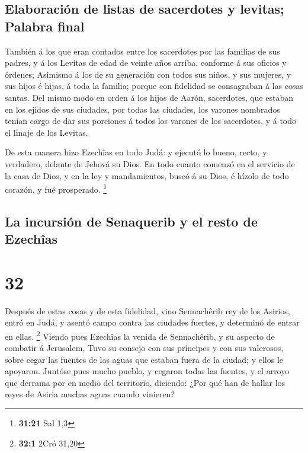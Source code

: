 \hypertarget{elaboraciuxf3n-de-listas-de-sacerdotes-y-levitas-palabra-final}{%
\subsection{Elaboración de listas de sacerdotes y levitas; Palabra
final}\label{elaboraciuxf3n-de-listas-de-sacerdotes-y-levitas-palabra-final}}

 También á los que eran contados entre los sacerdotes por
las familias de sus padres, y á los Levitas de edad de veinte años
arriba, conforme á sus oficios y órdenes;  Asimismo á los
de su generación con todos sus niños, y sus mujeres, y sus hijos é
hijas, á toda la familia; porque con fidelidad se consagraban á las
cosas santas.  Del mismo modo en orden á los hijos de
Aarón, sacerdotes, que estaban en los ejidos de sus ciudades, por todas
las ciudades, los varones nombrados tenían cargo de dar sus porciones á
todos los varones de los sacerdotes, y á todo el linaje de los Levitas.

 De esta manera hizo Ezechîas en todo Judá: y ejecutó lo
bueno, recto, y verdadero, delante de Jehová su Dios.  En
todo cuanto comenzó en el servicio de la casa de Dios, y en la ley y
mandamientos, buscó á su Dios, é hízolo de todo corazón, y fué
prosperado. \footnote{\textbf{31:21} Sal 1,3}

\hypertarget{la-incursiuxf3n-de-senaquerib-y-el-resto-de-ezechuxeeas}{%
\subsection{La incursión de Senaquerib y el resto de
Ezechîas}\label{la-incursiuxf3n-de-senaquerib-y-el-resto-de-ezechuxeeas}}

\hypertarget{section-31}{%
\section{32}\label{section-31}}

 Después de estas cosas y de esta fidelidad, vino
Sennachêrib rey de los Asirios, entró en Judá, y asentó campo contra las
ciudades fuertes, y determinó de entrar en ellas. \footnote{\textbf{32:1}
  2Cró 31,20}  Viendo pues Ezechîas la venida de
Sennachêrib, y su aspecto de combatir á Jerusalem,  Tuvo
su consejo con sus príncipes y con sus valerosos, sobre cegar las
fuentes de las aguas que estaban fuera de la ciudad; y ellos le
apoyaron.  Juntóse pues mucho pueblo, y cegaron todas las
fuentes, y el arroyo que derrama por en medio del territorio, diciendo:
¿Por qué han de hallar los reyes de Asiria muchas aguas cuando vinieren?


